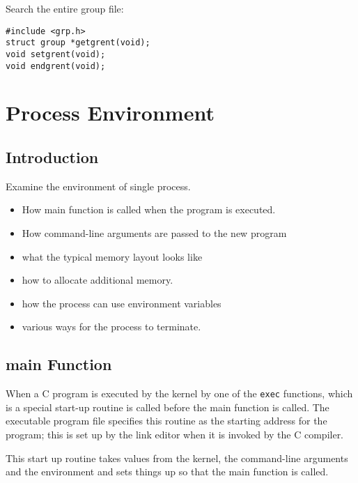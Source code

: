 \documentclass[a4paper,10pt]{book}
\begin{document}
Search the entire group file:
\begin{verbatim}
#include <grp.h>
struct group *getgrent(void);
void setgrent(void);
void endgrent(void);
\end{verbatim}
\chapter{Process Environment}
\section{Introduction}
Examine the environment of single process.
\begin{itemize}
\item How main function is called when the program is executed.
\item How command-line arguments are passed to the new program
\item what the typical memory layout looks like
\item how to allocate additional memory.
\item how the process can use environment variables
\item various ways for the process to terminate.
\end{itemize}
\section{main Function}
When a C program is executed by the kernel by one of the \verb|exec| functions,
which is a special start-up routine is called before the main function is
called. The executable program file specifies this routine as the starting
address for the program; this is set up by the link editor when it is invoked by
the C compiler.

This start up routine takes values from the kernel, the command-line arguments
and the environment and sets things up so that the main function is called.
\end{document}

